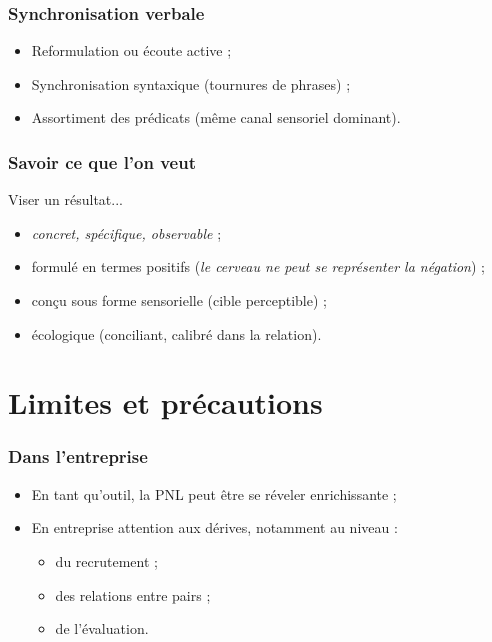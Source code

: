 \documentclass{beamer}
\begin{document}
\begin{frame}[t]\frametitle{Synchronisation verbale}
	\begin{itemize}
		\item Reformulation ou écoute active ;
		\item Synchronisation syntaxique (tournures de phrases) ;
		\item Assortiment des prédicats (même canal sensoriel dominant).
	\end{itemize}
\end{frame}

\begin{frame}[t]\frametitle{Savoir ce que l'on veut}
	\begin{block}{Viser un résultat...}
		\begin{itemize}
			\item \emph{concret, spécifique, observable} ;
			\item formulé en termes positifs (\emph{le cerveau ne peut se représenter la négation}) ;
			\item conçu sous forme sensorielle (cible perceptible) ;
			\item écologique (conciliant, calibré dans la relation).
		\end{itemize}
	\end{block}
\end{frame}

\section{Limites et précautions}

\begin{frame}[t]\frametitle{Dans l'entreprise}
	\begin{itemize}
		\item<+-> En tant qu'outil, la PNL peut être se réveler enrichissante ;
		\item<+-> En entreprise attention aux dérives, notamment au niveau :
			\begin{itemize}
				\item du recrutement ;
				\item des relations entre pairs ;
				\item de l'évaluation.
			\end{itemize}
	\end{itemize}
\end{frame}
\end{document}
